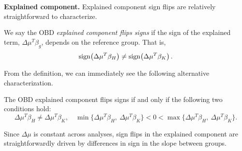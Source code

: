 \textbf{Explained component.} Explained component sign flips are relatively straightforward to characterize.
\begin{definition}
	\label{defn:sign_flip_explained}
	We say the OBD \emph{explained component flips signs} if the sign of the explained term, $\Delta\mu^T \beta_g$, depends on the reference group. That is,
	\begin{equation}
        \label{eq:sign_flip_condition_explained_neq}
		\operatorname{sign}\!\left(\Delta\mu^T \beta_H\right) \neq \operatorname{sign}\!\left(\Delta\mu^T \beta_K\right).
	\end{equation}
\end{definition}

From the definition, we can immediately see the following alternative characterization.
%
\begin{remark}
    \label{rmk:explained_ordering_sensitivity}
    The OBD explained component flips signs if and only if the following two conditions hold:
    \begin{equation}
    \label{eq:sign_flip_condition_explained}
        \Delta\mu^T \beta_H \neq \Delta\mu^T \beta_K, \quad \min\{\Delta\mu^T \beta_H,\ \Delta\mu^T \beta_K\} < 0 < \max\{\Delta\mu^T \beta_H,\ \Delta\mu^T \beta_K\}.
    \end{equation}
\end{remark}
Since $\Delta\mu$ is constant across analyses, sign flips in the explained component are straightforwardly driven
by differences in sign in the slope between groups.



